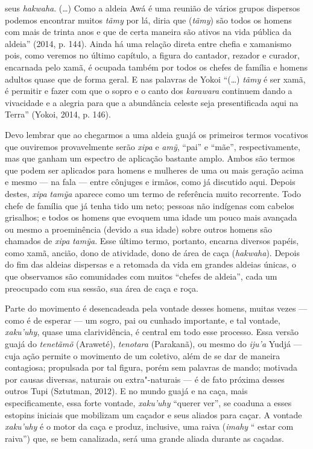 seus \emph{hakwaha}. (\ldots{}) Como a aldeia Awá é uma reunião de vários
grupos dispersos podemos encontrar muitos \emph{tãmy} por lá, diria que
(\emph{tãmy}) são todos os homens com mais de trinta anos e que de certa
maneira são ativos na vida pública da aldeia'' (2014, p. 144). Ainda há
uma relação direta entre chefia e xamanismo pois, como veremos no último
capítulo, a figura do cantador, rezador e curador, encarnada pelo xamã,
é ocupada também por todos os chefes de família e homens adultos quase
que de forma geral. E nas palavras de Yokoi ``(\ldots{}) \emph{tãmy} é ser
xamã, é permitir e fazer com que o sopro e o canto dos \emph{karawara}
continuem dando a vivacidade e a alegria para que a abundância celeste
seja presentificada aqui na Terra'' (Yokoi, 2014, p. 146).

Devo lembrar que ao chegarmos a uma aldeia guajá os primeiros termos
vocativos que ouviremos provavelmente serão \emph{xipa} e \emph{amỹ},
``pai'' e ``mãe'', respectivamente, mas que ganham um espectro de
aplicação bastante amplo. Ambos são termos que podem ser aplicados para
homens e mulheres de uma ou mais geração acima e mesmo --- na fala --- entre
cônjuges e irmãos, como já discutido aqui. Depois destes, \emph{xipa}
\emph{tamỹa} aparece como um termo de referência muito recorrente. Todo chefe de família que já tenha tido um neto; pessoas não indígenas com cabelos grisalhos; e todos os homens que evoquem uma idade um pouco mais avançada ou mesmo a proeminência (devido a sua idade) sobre outros homens são chamados de \emph{xipa} \emph{tamỹa}. Esse último termo,
portanto, encarna diversos papéis, como xamã, ancião, dono de atividade,
dono de área de caça (\emph{hakwaha}). Depois do fim das aldeias
dispersas e a retomada da vida em grandes aldeias únicas, o que
observamos são comunidades com muitos ``chefes de aldeia'', cada um
preocupado com sua sessão, sua área de caça e roça.

Parte do movimento é desencadeada pela vontade desses homens, muitas
vezes --- como é de esperar --- um sogro, pai ou cunhado importante, e tal
vontade, \emph{xaku'uhy}, quase uma clarividência, é central em todo
esse processo. Essa versão guajá do \emph{tenetãmõ} (Araweté),
\emph{tenotara} (Parakanã), ou mesmo do \emph{iju'a} Yudjá --- cuja ação
permite o movimento de um coletivo, além de se dar de maneira
contagiosa; propulsada por tal figura, porém sem palavras de mando;
motivada por causas diversas, naturais ou extra"-naturais --- é de fato
próxima desses outros Tupi (Sztutman, 2012). E no mundo guajá e na caça,
mais especificamente, essa forte vontade, \emph{xaku'uhy} ``querer ver'',
se coaduna a esses estopins iniciais que mobilizam um caçador e seus
aliados para caçar. A vontade \emph{xaku'uhy} é o motor da caça e
produz, inclusive, uma raiva (\emph{imahy} `` estar com raiva'') que, se
bem canalizada, será uma grande aliada durante as caçadas.

